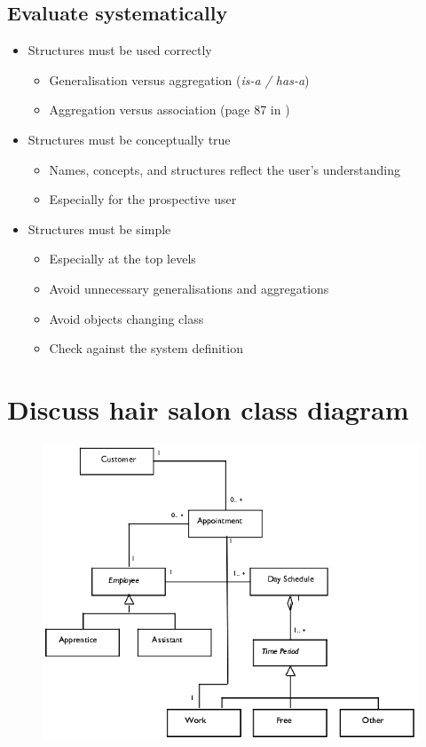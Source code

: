 \subsection{Evaluate systematically}
\begin{itemize}
    \item Structures must be used correctly
    \begin{itemize}
        \item Generalisation versus aggregation (\textit{is-a / has-a})
        \item Aggregation versus association (page 87 in \ad)
    \end{itemize}
    \item Structures must be conceptually true
    \begin{itemize}
        \item Names, concepts, and structures reflect the user's understanding
        \item Especially for the prospective user
    \end{itemize}
    \item Structures must be simple
    \begin{itemize}
        \item Especially at the top levels
        \item Avoid unnecessary generalisations and aggregations
        \item Avoid objects changing class
        \item Check against the system definition
    \end{itemize}
\end{itemize}

\section{Discuss hair salon class diagram}
\begin{figure}[H]
    \centering
    \includegraphics[width=.75\textwidth]{figures/hairsalondiscussion.png}
\end{figure}

